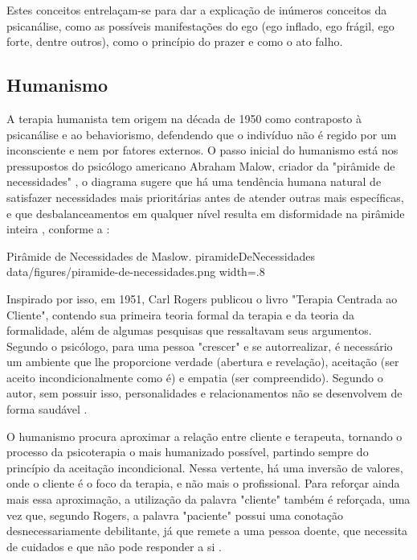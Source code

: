 Estes conceitos entrelaçam-se para dar a explicação de inúmeros conceitos da psicanálise, como as possíveis manifestações do ego (ego inflado, ego frágil, ego forte, dentre outros), como o princípio do prazer e como o ato falho.

\subsection{Humanismo}
\label{sec:Humanismo}
A terapia humanista tem origem na década de 1950 como contraposto à psicanálise e ao behaviorismo, defendendo que o indivíduo não é regido por um inconsciente e nem por fatores externos. O passo inicial do humanismo está nos pressupostos do psicólogo americano Abraham Malow, criador da "pirâmide de necessidades" \cite{Pimenta2019}, o diagrama sugere que há uma tendência humana natural de satisfazer necessidades mais prioritárias antes de atender outras mais específicas, e que desbalanceamentos em qualquer nível resulta em disformidade na pirâmide inteira \cite{Mcleod2023}, conforme a :

\image
    {Pirâmide de Necessidades de Maslow.}
    {piramideDeNecessidades}
    {data/figures/piramide-de-necessidades.png}
    {width=.8\textwidth}
    {}

Inspirado por isso, em 1951, Carl Rogers publicou o livro "Terapia Centrada ao Cliente", contendo sua primeira teoria formal da terapia e da teoria da formalidade, além de algumas pesquisas que ressaltavam seus argumentos. Segundo o psicólogo, para uma pessoa "crescer" e se autorrealizar, é necessário um ambiente que lhe proporcione verdade (abertura e revelação), aceitação (ser aceito incondicionalmente como é) e empatia (ser compreendido). Segundo o autor, sem possuir isso, personalidades e relacionamentos não se desenvolvem de forma saudável \cite{Pimenta2019}.

O humanismo procura aproximar a relação entre cliente e terapeuta, tornando o processo da psicoterapia o mais humanizado possível, partindo sempre do princípio da aceitação incondicional. Nessa vertente, há uma inversão de valores, onde o cliente é o foco da terapia, e não mais o profissional. Para reforçar ainda mais essa aproximação, a utilização da palavra "cliente" também é reforçada, uma vez que, segundo Rogers, a palavra "paciente" possui uma conotação desnecessariamente debilitante, já que remete a uma pessoa doente, que necessita de cuidados e que não pode responder a si \cite{Barros2022}.


